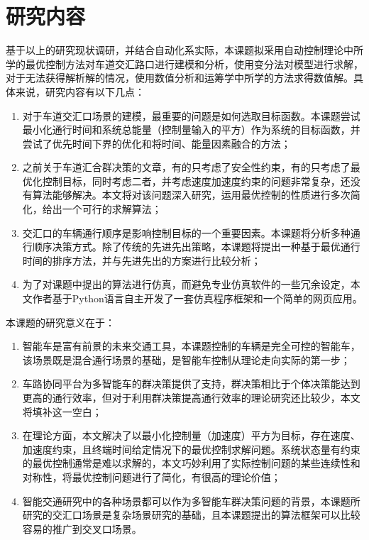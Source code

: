 \section{研究内容}
基于以上的研究现状调研，并结合自动化系实际，本课题拟采用自动控制理论中所学的最优控制方法对车道交汇路口进行建模和分析，使用变分法对模型进行求解，对于无法获得解析解的情况，使用数值分析和运筹学中所学的方法求得数值解。具体来说，研究内容有以下几点：
\begin{enumerate}[label=(\arabic*),wide=\parindent]
\item 对于车道交汇口场景的建模，最重要的问题是如何选取目标函数。本课题尝试最小化通行时间和系统总能量（控制量输入的平方）作为系统的目标函数，并尝试了优先时间下界的优化和将时间、能量因素融合的方法；
\item 之前关于车道汇合群决策的文章，有的只考虑了安全性约束，有的只考虑了最优化控制目标，同时考虑二者，并考虑速度加速度约束的问题非常复杂，还没有算法能够解决。本文将对该问题深入研究，运用最优控制的性质进行多次简化，给出一个可行的求解算法；
\item 交汇口的车辆通行顺序是影响控制目标的一个重要因素。本课题将分析多种通行顺序决策方式。除了传统的先进先出策略，本课题将提出一种基于最优通行时间的排序方法，并与先进先出的方案进行比较分析；
\item 为了对课题中提出的算法进行仿真，而避免专业仿真软件的一些冗余设定，本文作者基于{\ttfamily Python}语言自主开发了一套仿真程序框架和一个简单的网页应用。
\end{enumerate}

本课题的研究意义在于：
\begin{enumerate}[label=(\arabic*),wide=\parindent]
\item 智能车是富有前景的未来交通工具，本课题控制的车辆是完全可控的智能车，该场景既是混合通行场景的基础，是智能车控制从理论走向实际的第一步；
\item 车路协同平台为多智能车的群决策提供了支持，群决策相比于个体决策能达到更高的通行效率，但对于利用群决策提高通行效率的理论研究还比较少，本文将填补这一空白；
\item 在理论方面，本文解决了以最小化控制量（加速度）平方为目标，存在速度、加速度约束，且终端时间给定情况下的最优控制求解问题。系统状态量有约束的最优控制通常是难以求解的，本文巧妙利用了实际控制问题的某些连续性和对称性，将最优控制问题进行了简化，有很高的理论价值；
\item 智能交通研究中的各种场景都可以作为多智能车群决策问题的背景，本课题所研究的交汇口场景是复杂场景研究的基础，且本课题提出的算法框架可以比较容易的推广到交叉口场景。
\end{enumerate}

